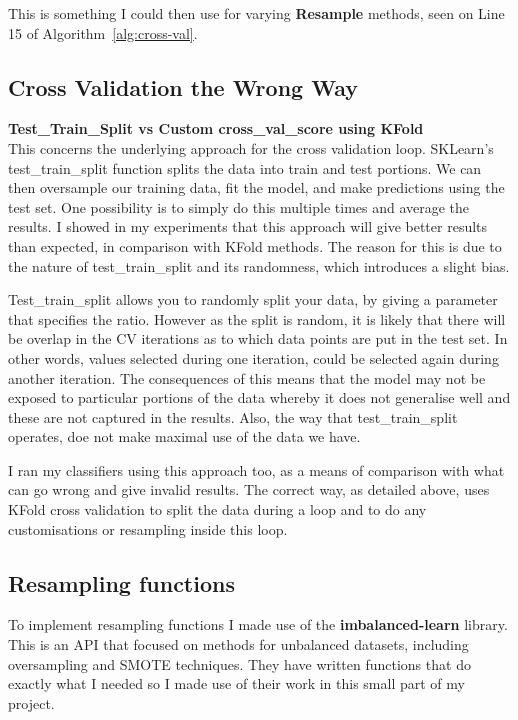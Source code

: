 \documentclass[12pt,a4paper,twoside]{report}
\begin{document}
This is something I could then use for varying \textbf{Resample} methods, seen on Line 15 of Algorithm~\ref{alg:cross-val}.

\subsection{Cross Validation the Wrong Way}

\textbf{Test\_Train\_Split vs Custom cross\_val\_score using KFold}\\
This concerns the underlying approach for the cross validation loop. SKLearn's test\_train\_split function splits the data into train and test portions. We can then oversample our training data, fit the model, and make predictions using the test set.
One possibility is to simply do this multiple times and average the results.
I showed in my experiments that this approach will give better results than expected, in comparison with KFold methods. The reason for this is due to the nature of test\_train\_split and its randomness, which introduces a slight bias.

Test\_train\_split allows you to randomly split your data, by giving a parameter that specifies the ratio. However as the split is random, it is likely that there will be overlap in the CV iterations as to which data points are put in the test set. In other words, values selected during one iteration, could be selected again during another iteration.
The consequences of this means that the model may not be exposed to particular portions of the data whereby it does not generalise well and these are not captured in the results. Also, the way that test\_train\_split operates, doe not make maximal use of the data we have.

I ran my classifiers using this approach too, as a means of comparison with what can go wrong and give invalid results. The correct way, as detailed above, uses KFold cross validation to split the data during a loop and to do any customisations or resampling inside this loop.

\subsection{Resampling functions}
To implement resampling functions I made use of the \textbf{imbalanced-learn}\cite{JMLR:v18:16-365} library. This is an API that focused on methods for unbalanced datasets, including oversampling and SMOTE techniques. They have written functions that do exactly what I needed so I made use of their work in this small part of my project. 
\end{document}
